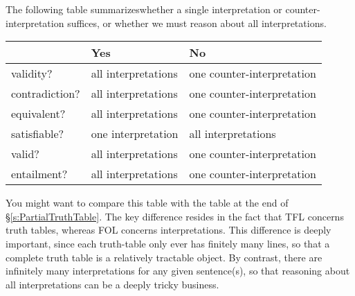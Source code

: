 The following table summarizeswhether a single interpretation or counter-interpretation suffices, or whether we must reason about all interpretations.

\begin{center}\small
\begin{tabular}{l l l}
 & \textbf{Yes} & \textbf{No}\\
 \hline
validity? & all interpretations & one counter-interpretation\\
contradiction? &  all interpretations  & one counter-interpretation\\
equivalent? & all interpretations & one counter-interpretation\\
satisfiable? & one interpretation & all interpretations\\
valid? & all interpretations & one counter-interpretation\\
entailment? & all interpretations & one counter-interpretation\\
\end{tabular}
\end{center}
\label{table.ModelOrArgument}

You might want to compare this table with the table at the end of \S\ref{s:PartialTruthTable}. The key difference resides in the fact that TFL concerns truth tables, whereas FOL concerns interpretations. This difference is deeply important, since each truth-table only ever has finitely many lines, so that a complete truth table is a relatively tractable object. By contrast, there are infinitely many interpretations for any given sentence(s), so that reasoning about all interpretations can be a deeply tricky business.
